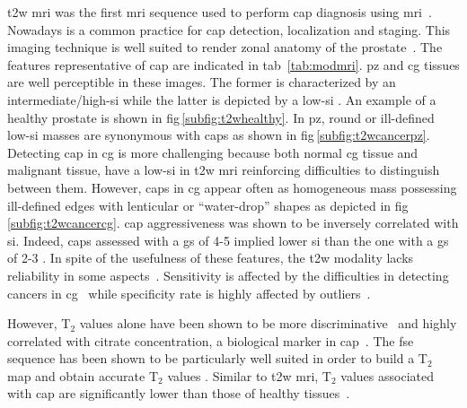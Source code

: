 \ac{t2w} \ac{mri} was the first \ac{mri} sequence used to perform \ac{cap} diagnosis using \ac{mri}~\cite{Hricak1983}. Nowadays is a common practice for \ac{cap} detection, localization and staging. This imaging technique is well suited to render zonal anatomy of the prostate~\cite{Barentsz2012}. The features representative of \ac{cap} are indicated in \acs{tab}~\ref{tab:modmri}. \ac{pz} and \ac{cg} tissues are well perceptible in these images. The former is characterized by an intermediate/high-\ac{si} while the latter is depicted by a low-\ac{si} \cite{Hricak1987}. An example of a healthy prostate is shown in \acs{fig}\,\ref{subfig:t2whealthy}. In \ac{pz}, round or ill-defined low-\ac{si} masses are synonymous with \acp{cap} \cite{Hricak1983} as shown in \acs{fig}\,\ref{subfig:t2wcancerpz}. Detecting \ac{cap} in \ac{cg} is more challenging because both normal \ac{cg} tissue and malignant tissue, have a low-\ac{si} in \ac{t2w} \ac{mri} reinforcing difficulties to distinguish between them. However, \acp{cap} in \ac{cg} appear often as homogeneous mass possessing ill-defined edges with lenticular or ``water-drop'' shapes \cite{Akin2006, Barentsz2012} as depicted in \ac{fig}\,\ref{subfig:t2wcancercg}. \ac{cap} aggressiveness was shown to be inversely correlated with \ac{si}. Indeed, \acp{cap} assessed with a \ac{gs} of 4-5 implied lower \ac{si} than the one with a \ac{gs} of 2-3 \cite{Wang2008}. In spite of the usefulness of these features, the \ac{t2w} modality lacks reliability in some aspects~\cite{Kirkham2006,Hoeks2011}. Sensitivity is affected by the difficulties in detecting cancers in \ac{cg}~\cite{Kirkham2006} while specificity rate is highly affected by outliers~\cite{Hricak1987,Quint1991,Scheidler1999,Cruz2002,Barentsz2012}.

However, T$_2$ values alone have been shown to be more discriminative~\cite{Liu2011} and highly correlated with citrate concentration, a biological marker in \ac{cap}~\cite{Liney1996,Liney1997}. The \Ac{fse} sequence has been shown to be particularly well suited in order to build a T$_2$ map and obtain accurate T$_2$ values \cite{Liney1996a}. Similar to \ac{t2w} \ac{mri}, T$_2$ values associated with \ac{cap} are significantly lower than those of healthy tissues~\cite{Liney1996,Gibbs2001}.

